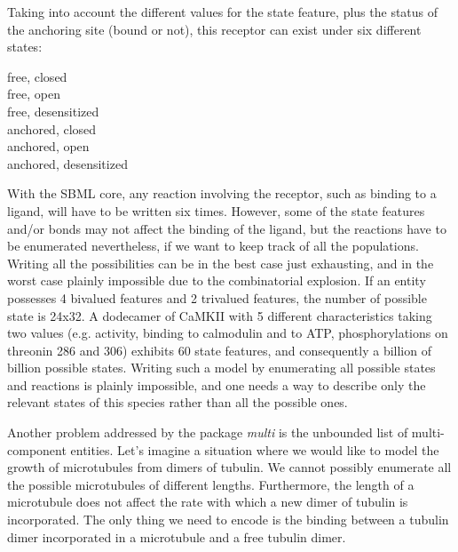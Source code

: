 Taking into account the different values for the state feature, plus the status of the anchoring site (bound or not), this receptor can exist under six different states:\\[\baselineskip] 

\begin{minipage}[c]{2in}
\noindent 
{free, closed}\\
{free, open}\\
{free, desensitized}\\
{anchored, closed}\\
{anchored, open}\\
{anchored, desensitized}\\
\end{minipage}

With the SBML core, any reaction involving the receptor, such as binding to a ligand, will have to be written six times. However, some of the state features and/or bonds may not affect the binding of the ligand, but the reactions have to be enumerated nevertheless, if we want to keep track of all the populations. Writing all the possibilities can be in the best case just exhausting, and in the worst case plainly impossible due to the combinatorial explosion. If an entity possesses 4 bivalued features and 2 trivalued features, the number of possible state is 24x32. A dodecamer of CaMKII with 5 different characteristics taking two values (e.g. activity, binding to calmodulin and to ATP, phosphorylations on threonin 286 and 306) exhibits 60 state features, and consequently a billion of billion possible states. Writing such a model by enumerating all possible states and reactions is plainly impossible, and one needs a way to describe only the relevant states of this species rather than all the possible ones.

Another problem addressed by the package \emph{multi} is the unbounded list of multi-component entities. Let's imagine a situation where we would like to model the growth of microtubules from dimers of tubulin. We cannot possibly enumerate all the possible microtubules of different lengths. Furthermore, the length of a microtubule does not affect the rate with which a new dimer of tubulin is incorporated. The only thing we need to encode is the binding between a tubulin dimer incorporated in a microtubule and a free tubulin dimer. 

